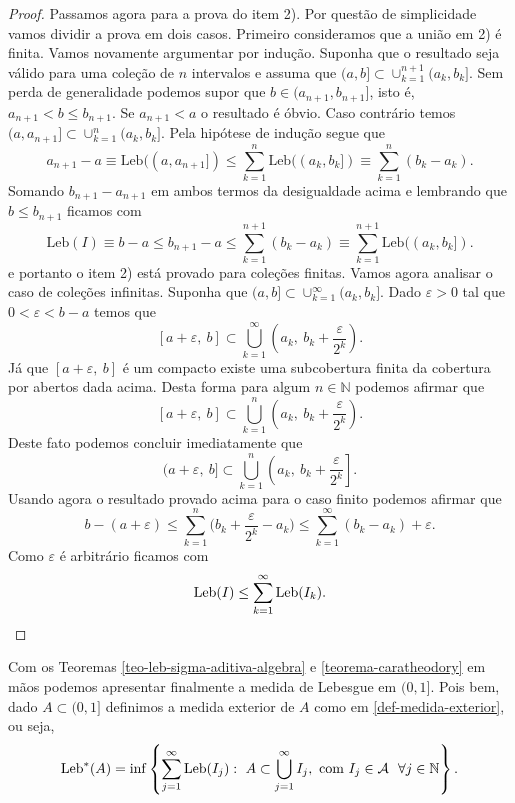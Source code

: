 \begin{proof}
Passamos agora para a prova do item 2). 
Por questão de simplicidade vamos dividir a 
prova em dois casos. Primeiro consideramos 
que a união em 2) é finita.
Vamos novamente argumentar por indução. 
Suponha que o resultado seja válido para
uma coleção de $n$ intervalos e assuma que 
$(a,b]\subset \cup_{k=1}^{n+1} (a_k,b_k]$.
Sem perda de generalidade podemos 
supor que $b\in (a_{n+1},b_{n+1}]$, 
isto é, $a_{n+1}<b\leq b_{n+1}$.
Se $a_{n+1}<a$ o resultado é óbvio.
Caso contrário temos $(a,a_{n+1}]\subset \cup_{k=1}^n (a_k,b_k]$.
Pela hipótese de indução segue que
\[
a_{n+1}-a
\equiv
\mathrm{Leb}((a,a_{n+1}])
\leq
\sum_{k=1}^n \mathrm{Leb}((a_k,b_k])
\equiv
\sum_{k=1}^n (b_k-a_k).
\]
Somando $b_{n+1}-a_{n+1}$ em ambos termos
da desigualdade acima e lembrando que 
$b\leq b_{n+1}$ ficamos com 
\[
\mathrm{Leb}(I)\equiv 
b-a
\leq
b_{n+1}-a
\leq  
\sum_{k=1}^{n+1} (b_k-a_k)
\equiv
\sum_{k=1}^{n+1} \mathrm{Leb}((a_k,b_k]).
\]
e portanto o item 2) está provado 
para coleções finitas. Vamos agora analisar o caso de coleções
infinitas. Suponha que $(a,b]\subset \cup_{k=1}^{\infty}(a_k,b_k]$.
Dado $\varepsilon>0$ tal que $0<\varepsilon<b-a$ temos que 
\[
[a+\varepsilon,\ b]
\subset 
\bigcup_{k=1}^{\infty} \left( a_k,\ b_{k}+\frac{\varepsilon}{2^k}\right).
\]
Já que $[a+\varepsilon,\ b]$ é um compacto existe uma subcobertura
finita da cobertura por abertos dada acima.
Desta forma para algum $n\in\mathbb{N}$ podemos afirmar que 
\[
[a+\varepsilon,\ b]
\subset 
\bigcup_{k=1}^{n} \left( a_k,\ b_{k}+\frac{\varepsilon}{2^k}\right).
\]
Deste fato podemos concluir imediatamente que 
\[
(a+\varepsilon,\ b]
\subset 
\bigcup_{k=1}^{n} \left( a_k,\ b_{k}+\frac{\varepsilon}{2^k}\right].
\]
Usando agora o resultado provado acima para o caso finito 
podemos afirmar que
\[
b-(a+\varepsilon)
\leq 
\sum_{k=1}^n 
\Big(b_k+\frac{\varepsilon}{2^k} -a_k\Big)
\leq
\sum_{k=1}^{\infty} (b_k-a_k)+\varepsilon.
\]
Como $\varepsilon$ é arbitrário ficamos com
\[
\mathrm{Leb}(I)
\leq
\sum_{k=1}^{\infty} \mathrm{Leb}(I_k). 
\qedhere
\]
\end{proof}


Com os Teoremas 
\ref{teo-leb-sigma-aditiva-algebra}
e
\ref{teorema-caratheodory}
em mãos
podemos apresentar finalmente a  medida de Lebesgue
em $(0,1]$.
Pois bem, dado $A\subset (0,1]$ 
definimos a medida exterior de $A$ como
em \eqref{def-medida-exterior}, ou seja,
$$
\textnormal{Leb}^{*}(A)=\inf 
	\left\{
		\sum_{j=1}^\infty \mathrm{Leb}(I_j):
		\ A\subset \bigcup_{j=1}^\infty I_j,
		\ \text{com}\ I_j\in \mathcal{A}\ \ \forall  j\in\mathbb{N}
	\right\}.
$$

